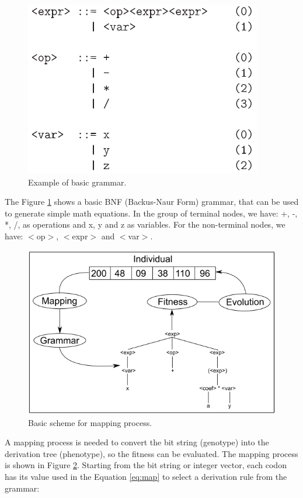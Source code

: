 \documentclass[journal]{IEEEtran}
\begin{document}
	\begin{figure}[!htb]
		\centering
		\includegraphics[scale=.6]{figures/grammar.png}
		\caption{Example of basic grammar. \cite{ryan1998grammatical}}
		\label{fig:grammar}
	\end{figure}
	
	The Figure \ref{fig:grammar} shows a basic BNF (Backus-Naur Form) grammar, that can be used to generate simple math equations. In the group of terminal nodes, we have: +, -, *, /, as operations and x, y and z as variables. For the non-terminal nodes, we have: $<$op$>$, $<$expr$>$ and $<$var$>$.
	
	\begin{figure}[!htb]
		\centering
		\includegraphics[scale=.4]{figures/ge_algo.png}
		\caption{Basic scheme for mapping process. \cite{cerri2013grammatical}}
		\label{fig:ge_algo}
	\end{figure}
	
	A mapping process is needed to convert the bit string (genotype) into the derivation tree (phenotype), so the fitness can be evaluated. The mapping process is shown in Figure \ref{fig:ge_algo}. Starting from the bit string or integer vector, each codon has its value used in the Equation \ref{eq:map} to select a derivation rule from the grammar:
	
\end{document}
